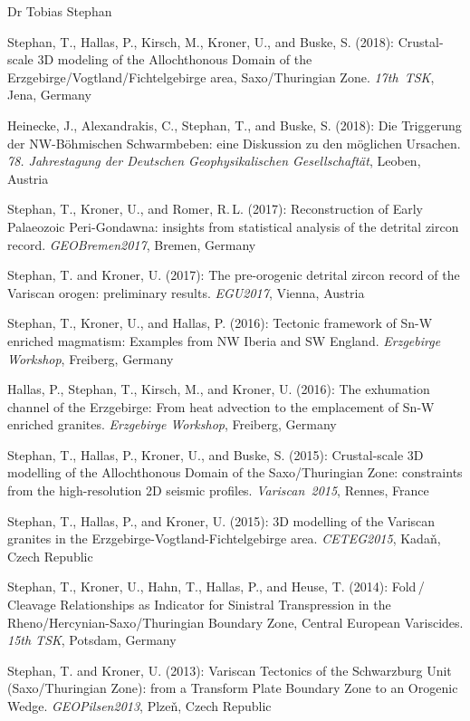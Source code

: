 \documentclass[10pt, paper=letter]{scrartcl} %
\begin{document}
\begin{cv}{\textcolor{myred}{\textsf{Dr Tobias Stephan}}}
\begin{cvlist}{}
        \item[10] Stephan, T., Hallas, P., Kirsch, M., Kroner, U., and Buske, S. (2018): Crustal-scale 3D modeling of the Allochthonous Domain of the Erzgebirge\-/Vogtland\-/Fichtelgebirge area, Saxo\-/Thuringian Zone. \textit{17th~TSK}, Jena, Germany
        \item[9] Heinecke, J., Alexandrakis, C., Stephan, T., and Buske, S. (2018): Die Triggerung der NW-B\"ohmischen Schwarmbeben: eine Diskussion zu den m\"oglichen Ursachen. \textit{78. Jahrestagung der Deutschen Geophysikalischen Gesellschaft\"at}, Leoben, Austria
        \item[8] Stephan, T., Kroner, U., and Romer, R.\,L. (2017): Reconstruction of Early Palaeozoic Peri-Gondawna: insights from statistical analysis of the detrital zircon record. \textit{GEOBremen2017}, Bremen, Germany
        \item[7] Stephan, T. and Kroner, U. (2017): The pre-orogenic detrital zircon record of the Variscan orogen: preliminary results. \textit{EGU2017}, \mbox{Vienna}, Austria
        \item[6] Stephan, T., Kroner, U., and Hallas, P. (2016): Tectonic framework of \mbox{Sn-W} enriched magmatism: Examples from NW Iberia and SW England. \textit{Erzgebirge Workshop}, Freiberg, Germany
        \item[5] Hallas, P., Stephan, T., Kirsch, M., and Kroner, U.  (2016): The exhumation channel of the Erzgebirge: From heat advection to the emplacement of Sn-W enriched granites. \textit{Erzgebirge Workshop}, Freiberg, Germany
        \item[4] Stephan, T., Hallas, P., Kroner, U., and Buske, S. (2015): Crustal-scale 3D modelling of the Allochthonous Domain of the Saxo\-/Thuringian Zone: constraints from the high-resolution 2D seismic profiles. \mbox{\textit{Variscan 2015}}, Rennes, France
        \item[3] Stephan, T., Hallas, P., and Kroner, U. (2015): 3D modelling of the Variscan granites in the Erzgebirge-Vogtland-Fichtelgebirge area. \mbox{\textit{CETEG2015}}, Kada\v{n}, Czech Republic
        \item[2] Stephan, T., Kroner, U., Hahn, T., Hallas, P., and Heuse, T. (2014): Fold\,/ Cleavage Relationships as Indicator for Sinistral Transpression in the Rheno\-/Hercynian\--Saxo\-/Thuringian Boundary Zone, Central European Variscides. \textit{15th TSK}, Potsdam, Germany
        \item[1] Stephan, T. and Kroner, U. (2013): Variscan Tectonics of the Schwarzburg Unit (Saxo\-/Thuringian Zone): from a Transform Plate Boundary Zone to an Orogenic Wedge. \textit{GEOPilsen2013}, Plze\v{n}, Czech Republic
    \end{cvlist}
    \endgroup


\end{cv}
\end{document}
